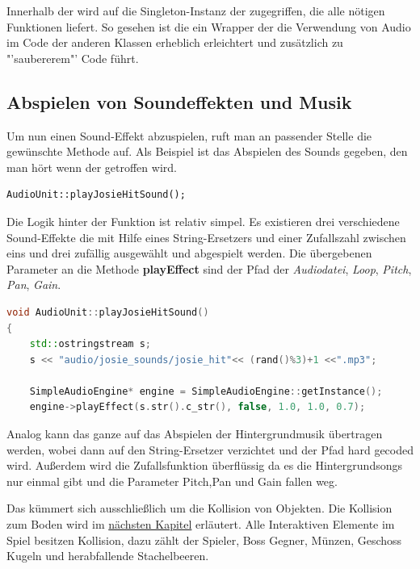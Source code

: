 Innerhalb der  wird auf die Singleton-Instanz der  zugegriffen, die alle nötigen Funktionen liefert. So gesehen ist die  ein Wrapper der die Verwendung von Audio im Code der anderen Klassen erheblich erleichtert und zusätzlich zu "'saubererem"' Code führt. 



\subsection{Abspielen von Soundeffekten und Musik} 
Um nun einen Sound-Effekt abzuspielen, ruft man an passender Stelle die gewünschte Methode auf. Als Beispiel ist das Abspielen des Sounds gegeben, den man hört wenn der  getroffen wird.

\begin{lstlisting}[style=singleline]
AudioUnit::playJosieHitSound();
\end{lstlisting}

Die Logik hinter der Funktion ist relativ simpel. Es existieren drei verschiedene Sound-Effekte die mit Hilfe eines String-Ersetzers und einer Zufallszahl zwischen eins und drei zufällig ausgewählt und abgespielt werden. Die übergebenen Parameter an die Methode \textbf{playEffect} sind der Pfad der \textit{Audiodatei}, \textit{Loop}, \textit{Pitch}, \textit{Pan}, \textit{Gain}.

\begin{lstlisting}[label=lst:playJosieShootSound,
				   language=C++,
				   firstnumber=30,
				   caption=BossLevel Shoot Sound abspielen ( AudioUnit.cpp )]
void AudioUnit::playJosieHitSound()
{
	std::ostringstream s;
	s << "audio/josie_sounds/josie_hit"<< (rand()%3)+1 <<".mp3";

	SimpleAudioEngine* engine = SimpleAudioEngine::getInstance();
	engine->playEffect(s.str().c_str(), false, 1.0, 1.0, 0.7);
\end{lstlisting}

Analog kann das ganze auf das Abspielen der Hintergrundmusik übertragen werden, wobei dann auf den String-Ersetzer verzichtet und der Pfad hard gecoded wird. Außerdem wird die Zufallsfunktion überflüssig da es die Hintergrundsongs nur einmal gibt und die Parameter Pitch,Pan und Gain fallen weg.



\label{sec:4_CollisionLayer}

Das  kümmert sich ausschließlich um die Kollision von Objekten. Die Kollision zum Boden wird im \href{sec:4_Kollisionsabfrage}{nächsten Kapitel} erläutert. Alle Interaktiven Elemente im Spiel besitzen Kollision, dazu zählt der Spieler, Boss Gegner, Münzen, Geschoss Kugeln und herabfallende Stachelbeeren.

